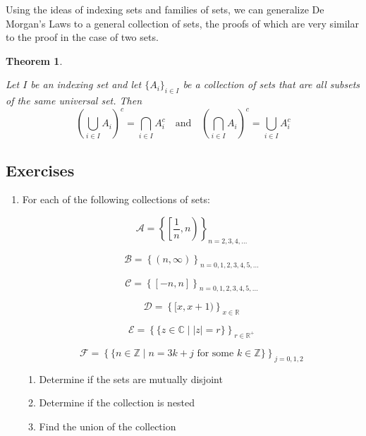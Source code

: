 \documentclass[
]{book}
\providecommand{\tightlist}{%
  \setlength{\itemsep}{0pt}\setlength{\parskip}{0pt}}
\newtheorem{theorem}{Theorem}[chapter]
\theoremstyle{definition}
\theoremstyle{definition}
\theoremstyle{definition}
\theoremstyle{definition}
\theoremstyle{remark}
\begin{document}
Using the ideas of indexing sets and families of sets, we can generalize De Morgan's Laws to a general collection of sets, the proofs of which are very similar to the proof in the case of two sets.

\begin{theorem}
\protect\hypertarget{thm:Generalized-De-Morgans-Laws}{}\label{thm:Generalized-De-Morgans-Laws}

Let \(I\) be an indexing set and let \(\{A_i\}_{i\in I}\) be a collection of sets that are all subsets of the same universal set. Then
\[\left( \bigcup_{i\in I} A_i \right)^c = \bigcap_{i \in I} A_i^c \quad \mbox{and} \quad \left( \bigcap_{i\in I} A_i \right)^c = \bigcup_{i \in I} A_i^c\]

\end{theorem}

\hypertarget{exercises-5}{%
\subsection{Exercises}\label{exercises-5}}

\begin{enumerate}
\def\labelenumi{\arabic{enumi}.}
\item
  For each of the following collections of sets:

  \[\displaystyle{\mathcal{A} = \left\{ \left[ \frac{1}{n},n\right) \right\}_{n=2,3,4,\ldots }}\]

  \[\displaystyle{\mathcal{B} = \left\{ \left( n,\infty \right) \right\}_{n=0,1,2,3,4,5,\ldots} }\]

  \[\displaystyle{\mathcal{C} = \left\{ \left[ -n, n \right] \right\}_{n=0,1,2,3,4,5,\ldots }}\]

  \[\displaystyle{\mathcal{D} = \left\{ [x,x+1)\right\}_{x\in \mathbb{R}}}\]

  \[\displaystyle{\mathcal{E} = \left\{ \{z\in \mathbb{C}\middle \vert|z|=r\}\right\}_{r\in \mathbb{R}^+} }\]

  \[\displaystyle{\mathcal{F} = \left\{ \{n\in \mathbb{Z}\middle \vert n=3k+j \mbox{ for some } k\in \mathbb{Z}\}\right\}_{j=0,1,2}}\]

  \begin{enumerate}
  \def\labelenumii{\alph{enumii}.}
  \tightlist
  \item
    Determine if the sets are mutually disjoint
  \item
    Determine if the collection is nested
  \item
    Find the union of the collection
  \end{enumerate}
\end{enumerate}
\end{document}
